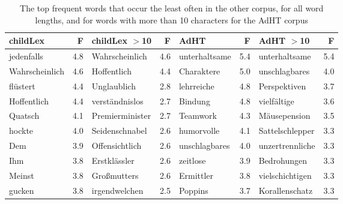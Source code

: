\documentclass[manuscript]{stjour}
\begin{document}
\begin{table}[!htbp]
\caption{The top frequent words that occur the least often in the other corpus, for all word lengths, and for words with more than 10 characters for the AdHT corpus}
\centering
\begin{tabular}{lrlrlrlr}
  \hline
childLex & F & childLex $>$10 & F & AdHT & F & AdHT $>$10 & F \\ 
  \hline
jedenfalls & 4.8 & Wahrscheinlich & 4.6 & unterhaltsame & 5.4 & unterhaltsame & 5.4 \\ 
  Wahrscheinlich & 4.6 & Hoffentlich & 4.4 & Charaktere & 5.0 & unschlagbares & 4.0 \\ 
  flüstert & 4.4 & Unglaublich & 2.8 & lehrreiche & 4.8 & Perspektiven & 3.7 \\ 
  Hoffentlich & 4.4 & verständnislos & 2.7 & Bindung & 4.8 & vielfältige & 3.6 \\ 
  Quatsch & 4.1 & Premierminister & 2.7 & Teamwork & 4.3 & Mäusepension & 3.5 \\ 
  hockte & 4.0 & Seidenschnabel & 2.6 & humorvolle & 4.1 & Sattelschlepper & 3.3 \\ 
  Dem & 3.9 & Offensichtlich & 2.6 & unschlagbares & 4.0 & unzertrennliche & 3.3 \\ 
  Ihm & 3.8 & Erstklässler & 2.6 & zeitlose & 3.9 & Bedrohungen & 3.3 \\ 
  Meinst & 3.8 & Großmutters & 2.6 & Ermittler & 3.8 & vielschichtigen & 3.3 \\ 
  gucken & 3.8 & irgendwelchen & 2.5 & Poppins & 3.7 & Korallenschatz & 3.3 \\ 
   \hline
\end{tabular}
\label{words-adht-low}
\end{table}
\end{document}
